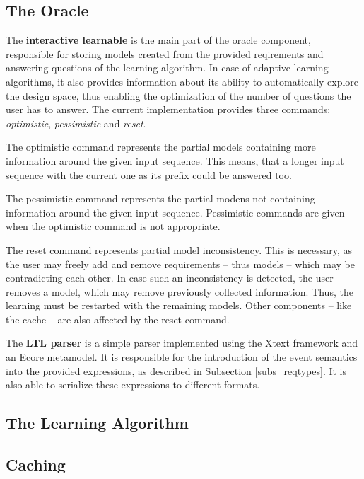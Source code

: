 \subsection{The Oracle} \label{subsec_oracleimpl}
The \textbf{interactive learnable} is the main part of the oracle component, responsible for storing models created from the provided reqirements and answering questions of the learning algorithm. In case of adaptive learning algorithms, it also provides information about its ability to automatically explore the design space, thus enabling the optimization of the number of questions the user has to answer. The current implementation provides three commands: \textit{optimistic}, \textit{pessimistic} and \textit{reset}.

The optimistic command represents the partial models containing more information around the given input sequence. This means, that a longer input sequence with the current one as its prefix could be answered too. 

The pessimistic command represents the partial modens not containing information around the given input sequence. Pessimistic commands are given when the optimistic command is not appropriate.

The reset command represents partial model inconsistency. This is necessary, as the user may freely add and remove requirements -- thus models -- which may be contradicting each other. In case such an inconsistency is detected, the user removes a model, which may remove previously collected information. Thus, the learning must be restarted with the remaining models. Other components -- like the cache -- are also affected by the reset command.

The \textbf{LTL parser} is a simple parser implemented using the Xtext framework and an Ecore metamodel. It is responsible for the introduction of the event semantics into the provided expressions, as described in Subsection \ref{subs_reqtypes}. It is also able to serialize these expressions to different formats.

\subsection{The Learning Algorithm} \label{subsec_adaptivedhc}





\subsection{Caching} \label{subsec_memoization}

